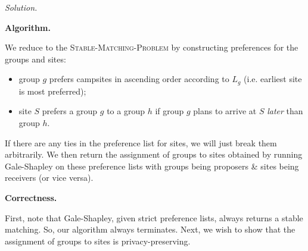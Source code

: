 \documentclass[11pt]{article}
\begin{document}
\newpage
{\color{blue}
\emph{Solution.}

\textbf{Algorithm.}

We reduce to the \textsc{Stable-Matching-Problem} by constructing preferences for the groups and sites:
\begin{itemize}
  \item group $g$ prefers campsites in ascending order according to $L_g$ (i.e. earliest site is most preferred);
  \item site $S$ prefers a group $g$ to a group $h$ if group $g$ plans to arrive at $S$ \emph{later} than group $h$.
\end{itemize}

If there are any ties in the preference list for sites, we will just break them arbitrarily. We then return the assignment of groups to sites obtained by running Gale-Shapley on these preference lists with groups being proposers \& sites being receivers (or vice versa).

\textbf{Correctness.}
%
%

First, note that Gale-Shapley, given strict preference lists, always returns a stable matching. So, our algorithm always terminates. Next, we wish to show that the assignment of groups to sites is privacy-preserving.

}
\end{document}
